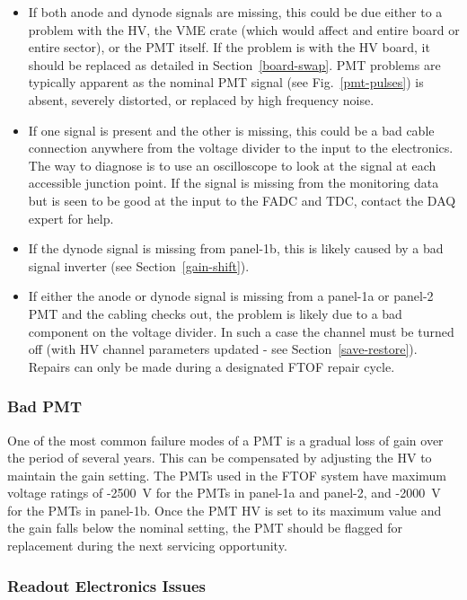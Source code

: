 \documentclass[12pt]{article}
\begin{document}
\begin{itemize}
\item If both anode and dynode signals are missing, this could be due either to a problem with the HV, 
the VME crate (which would affect and entire board or entire sector), or the PMT itself. If the problem
is with the HV board, it should be replaced as detailed in Section~\ref{board-swap}. PMT problems are
typically apparent as the nominal PMT signal (see Fig.~\ref{pmt-pulses}) is absent, severely distorted, 
or replaced by high frequency noise.
\item If one signal is present and the other is missing, this could be a bad cable connection anywhere
from the voltage divider to the input to the electronics. The way to diagnose is to use an
oscilloscope to look at the signal at each accessible junction point. If the signal is missing from the
monitoring data but is seen to be good at the input to the FADC and TDC, contact the DAQ expert for
help.
\item If the dynode signal is missing from panel-1b, this is likely caused by a bad signal inverter
(see Section~\ref{gain-shift}).
\item If either the anode or dynode signal is missing from a panel-1a or panel-2 PMT and the cabling
checks out, the problem is likely due to a bad component on the voltage divider. In such a case the
channel must be turned off (with HV channel parameters updated - see Section~\ref{save-restore}). 
Repairs can only be made during a designated FTOF repair cycle.
\end{itemize}

\subsubsection{Bad PMT}
\label{bad-pmt}

One of the most common failure modes of a PMT is a gradual loss of gain over the period of
several years. This can be compensated by adjusting the HV to maintain the gain setting. The
PMTs used in the FTOF system have maximum voltage ratings of -2500~V for the PMTs in panel-1a
and panel-2, and -2000~V for the PMTs in panel-1b. Once the PMT HV is set to its maximum value
and the gain falls below the nominal setting, the PMT should be flagged for replacement during
the next servicing opportunity.

\subsubsection{Readout Electronics Issues}
\label{readout-issues}
\end{document}
